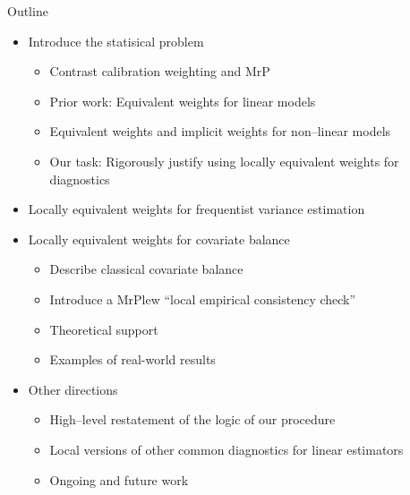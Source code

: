 

\begin{frame}{Outline}
%
%
\begin{itemize}
    \item Introduce the statisical problem
    \begin{itemize}
        \item Contrast calibration weighting and MrP
        \item Prior work: Equivalent weights for linear models
        \item Equivalent weights and implicit weights for non--linear models
        \item Our task: Rigorously justify using locally equivalent weights for diagnostics
    \end{itemize} \pause
    \item Locally equivalent weights for frequentist variance estimation \pause
    \item Locally equivalent weights for covariate balance
    \begin{itemize}
        \item Describe classical covariate balance
        \item Introduce a MrPlew ``local empirical consistency check''
        \item Theoretical support
        \item Examples of real-world results
    \end{itemize} \pause
    \item Other directions
    \begin{itemize}
            \item High--level restatement of the logic of our procedure
            \item Local versions of other common diagnostics for linear estimators
            \item Ongoing and future work
    \end{itemize}
\end{itemize}
%
\end{frame}
